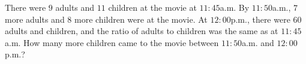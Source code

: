 There were $9$ adults and $11$ children at the movie at $11{:}45$a.m. By $11{:}50$a.m., $7$ more adults and $8$ more children were at the movie. At $12{:}00$p.m., there were $60$ adults and children, and the ratio of adults to children was the same as at $11{:}45$a.m. How many more children came to the movie between $11{:}50$a.m. and $12{:}00$p.m.?
